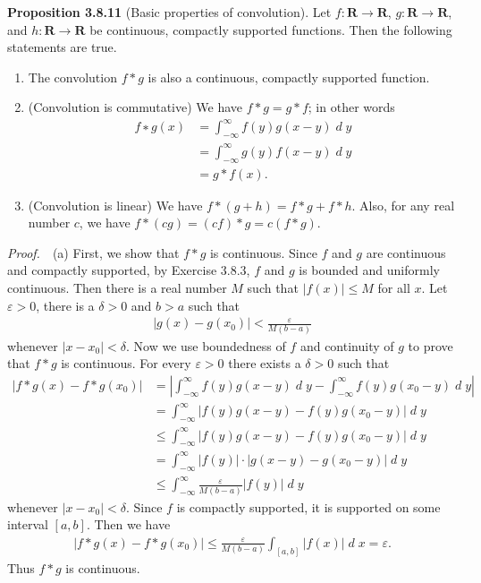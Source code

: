 \documentclass{book}
\DeclareMathOperator{\dd}{\mathit{d}}%
\newcommand{\pff}{\vspace{.25em}\noindent\emph{Proof.}~~}
\newcommand{\titl}[1]{\noindent\textbf{#1}}
\newcounter{Exercise}[section]
\begin{document}
\begin{framed}
\titl{Proposition 3.8.11} (Basic properties of convolution). Let $f : \mathbf{R} \to \mathbf{R}$, $g : \mathbf{R} \to \mathbf{R}$, and $h : \mathbf{R} \to \mathbf{R}$ be continuous, compactly supported functions. Then the following statements are true.
\begin{enumerate}
    \item The convolution $f*g$ is also a continuous, compactly supported function.
    \item (Convolution is commutative) We have $f*g = g*f$; in other words
        \begin{align*}
            f ∗g(x)
            &= \int_{-\infty}^{\infty} f(y)g(x - y) \dd y\\
            &= \int_{-\infty}^{\infty} g(y)f(x - y) \dd y\\
            &= g*f(x).
        \end{align*}
    \item (Convolution is linear) We have $f*(g + h) = f*g + f*h$. Also, for any real number $c$, we have $f*(cg) = (cf)*g = c(f*g)$.
\end{enumerate}
\end{framed}

\pff (a) First, we show that $f*g$ is continuous. Since $f$ and $g$ are continuous and compactly supported, by Exercise 3.8.3, $f$ and $g$ is bounded and uniformly continuous. Then there is a real number $M$ such that $|f(x)| \leq M$ for all $x$. Let $\varepsilon > 0$, there is a $\delta > 0$ and $b > a$ such that
    \begin{align*}
        |g(x) - g(x_0)| < \frac{\varepsilon}{M(b - a)}
    \end{align*}
whenever $|x - x_0| < \delta$. Now we use boundedness of $f$ and continuity of $g$ to prove that $f*g$ is continuous. For every $\varepsilon > 0$ there exists a $\delta > 0$ such that
    \begin{align*}
        |f*g(x) - f*g(x_0)|
        &= \left|\int_{-\infty}^{\infty} f(y)g(x - y) \dd y - \int_{-\infty}^{\infty} f(y)g(x_0 - y) \dd y\right|\\
        &= \int_{-\infty}^{\infty} |f(y)g(x - y) - f(y)g(x_0 - y)| \dd y\\
        &\leq \int_{-\infty}^{\infty} |f(y)g(x - y) - f(y)g(x_0 - y)| \dd y\\
        &= \int_{-\infty}^{\infty} |f(y)| \cdot |g(x - y) - g(x_0 - y)| \dd y\\
        &\leq \int_{-\infty}^{\infty} \frac{\varepsilon}{M(b - a)}|f(y)| \dd y
    \end{align*}
whenever $|x - x_0| < \delta$. Since $f$ is compactly supported, it is supported on some interval $[a, b]$. Then we have
    \begin{align*}
        |f*g(x) - f*g(x_0)|
        \leq \frac{\varepsilon}{M(b - a)}\int_{[a, b]} |f(x)| \dd x
        = \varepsilon.
    \end{align*}
Thus $f*g$ is continuous.
\end{document}
